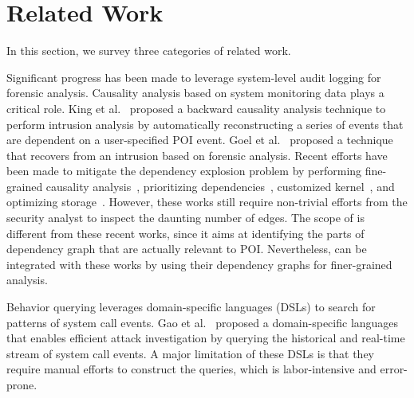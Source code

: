 
\section{Related Work}
\label{sec:literature}

In this section, we survey three categories of related work.


Significant progress has been made to leverage system-level audit logging for forensic analysis.
%
Causality analysis based on system monitoring data plays a critical role.
King et al.~\cite{backtracking,backtracking2} proposed a backward causality analysis technique to perform intrusion analysis by automatically reconstructing a series of events that are dependent on a user-specified POI event.
Goel et al.~\cite{taser} proposed a technique that recovers from an intrusion based on forensic analysis.
Recent efforts have been made to mitigate the dependency explosion problem by performing fine-grained causality analysis~\cite{beep,ma2016protracer,mcitracking,ji2017rain,ji2018enabling}, prioritizing dependencies~\cite{liu2018priotracker}, customized kernel~\cite{trustkernel}, and optimizing storage~\cite{loggc,reduction,reduction2}. 
%
%
%
However, these works still require non-trivial efforts from the security analyst to inspect the daunting number of edges.
%
The scope of \tool is different from these recent works, since it aims at identifying the parts of dependency graph that are actually relevant to POI.
Nevertheless, \tool can be integrated with these works by using their dependency graphs for finer-grained analysis.


Behavior querying leverages domain-specific languages (DSLs) to search for patterns of system call events.
Gao et al.~\cite{gao2018aiql,gao2018saql} proposed a domain-specific languages that enables efficient attack investigation by querying the historical and real-time stream of system call events.
A major limitation of these DSLs is that they require manual efforts to construct the queries, which is labor-intensive and error-prone.

